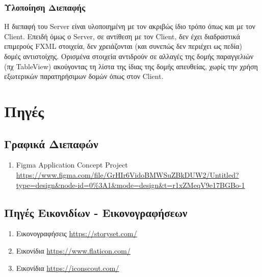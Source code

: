         \subsection{Υλοποίηση Διεπαφής}
        \label{sec:SubSectionName2.2.6}
        Η διεπαφή του Server είναι υλοποιημένη με τον ακριβώς ίδιο τρόπο όπως και με τον Client. Επειδή όμως ο Server, σε αντίθεση με τον Client, δεν έχει διαδραστικά επιμερούς FXML στοιχεία, δεν χρειάζονται (και συνεπώς δεν περιέχει ως πεδία) δομές αντιστοίχης. Ορισμένα στοιχεία αντιδρούν σε αλλαγές της δομής παραγγελιών (πχ TableView) ακούγοντας τη λίστα της ίδιας της δομής απευθείας, χωρίς την χρήση εξωτερικών παρατηρήσιμων δομών όπως στον Client.


\chapter{Πηγές}
\label{ch:ChapterName3}

    \section{Γραφικά Διεπαφών}
    \label{sec:SectionName3.1}
    \begin{enumerate}
        \item Figma Application Concept Project \url{https://www.figma.com/file/GrHIr6VidoBMWSuZBkDUW2/Untitled?type=design&node-id=0%3A1&mode=design&t=r1xZMeqV9e17BGBo-1}
    \end{enumerate}

    \section{Πηγές Εικονιδίων - Εικονογραφήσεων}
    \label{sec:SectionName3.2}
    \begin{enumerate}
        \item Εικονογραφήσεις \url{https://storyset.com/ }
        \item Εικονίδια \url{https://www.flaticon.com/}
        \item Εικονίδια \url{https://iconscout.com/}
    \end{enumerate}


